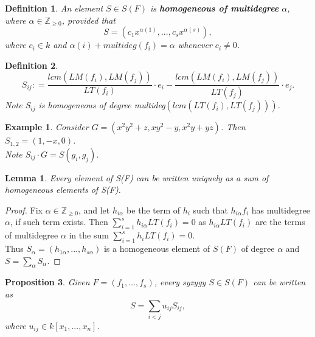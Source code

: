\documentclass{beamer}
\newtheorem{prop}{Proposition}
\newtheorem{defn}[prop]{Definition}
\newtheorem{lem}{Lemma}
\newtheorem{ex}{Example}
\newtheorem{n}{Note}
\begin{document}
\begin{frame}
\begin{small}

\begin{defn}
An element $S\in S(F)$ is \textbf{homogeneous of multidegree} $\alpha$, where $\alpha \in \mathbb{Z}_{\geq0}$, provided that $$S = (c_1x^{\alpha(1)}, ..., c_sx^{\alpha(s)}),$$ where $c_i\in k$ and $\alpha(i) + multideg(f_i) = \alpha$ whenever $c_i\neq 0$. 
\end{defn}
\pause
\begin{defn}
$$S_{ij} : = \frac{lcm(LM(f_i),LM(f_j))}{LT(f_i)}\cdot \textbf{$e_i$} - \frac{lcm(LM(f_i),LM(f_j))}{LT(f_j)}\cdot \textbf{$e_j$}. $$ Note $S_{ij}$ is homogeneous of degree multideg$(lcm(LT(f_i),LT(f_j)))$.
\end{defn}
\pause

\begin{ex}
Consider $G = (x^2y^2+z,xy^2-y,x^2y+yz)$. Then
\\$S_{1,2} = (1,-x,0)$. 
\\Note $S_{ij}\cdot G = S(g_i,g_j).$
\end{ex}

\end{small}
\end{frame}



\begin{frame}
\begin{lem}
Every element of S(F) can be written uniquely as a sum of homogeneous elements of S(F). 
\end{lem}

\begin{proof}
Fix $\alpha \in \mathbb{Z}_{\geq0}$, and let $h_{i\alpha}$ be the term of $h_i$ such that $h_{i\alpha}f_i$ has multidegree $\alpha$, if such term exists. Then $\sum_{i=1}^s h_{i\alpha}LT(f_i) = 0$ as $h_{i\alpha}LT(f_i)$ are the terms of multidegree $\alpha$ in the sum $\sum_{i=1}^s h_{i}LT(f_i) = 0$.
\\Thus $S_{\alpha} = (h_{1\alpha}, ..., h_{s\alpha})$ is a homogeneous element of $S(F)$ of degree $\alpha$ and $S = \sum_{\alpha}S_{\alpha}$.
\end{proof}
\pause
\begin{prop}
Given $F = (f_1, ..., f_s)$, every syzygy $S\in S(F)$ can be written as 
$$S = \sum_{i<j}u_{ij}S_{ij},$$
where $u_{ij}\in k[x_1,...,x_n]$. 
\end{prop}
\end{frame}
\end{document}
